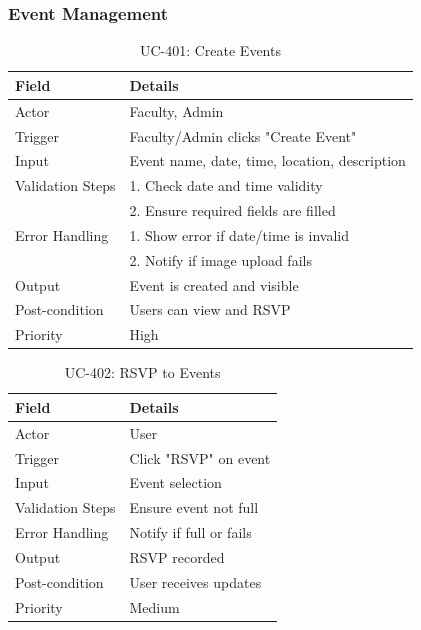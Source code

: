 \subsubsection{Event Management}
\begin{table}[H]
\centering
\caption{UC-401: Create Events}
\begin{tabular}{|l|p{10cm}|}
\hline
\textbf{Field} & \textbf{Details} \\ \hline
Actor & Faculty, Admin \\ \hline
Trigger & Faculty/Admin clicks "Create Event" \\ \hline
Input & Event name, date, time, location, description \\ \hline
Validation Steps & 1. Check date and time validity \\ 
                 & 2. Ensure required fields are filled \\ \hline
Error Handling & 1. Show error if date/time is invalid \\ 
               & 2. Notify if image upload fails \\ \hline
Output & Event is created and visible \\ \hline
Post-condition & Users can view and RSVP \\ \hline
Priority & High \\ \hline
\end{tabular}
\end{table}

\begin{table}[H]
\centering
\caption{UC-402: RSVP to Events}
\begin{tabular}{|l|p{10cm}|}
\hline
\textbf{Field} & \textbf{Details} \\ \hline
Actor & User \\ \hline
Trigger & Click "RSVP" on event \\ \hline
Input & Event selection \\ \hline
Validation Steps & Ensure event not full \\ \hline
Error Handling & Notify if full or fails \\ \hline
Output & RSVP recorded \\ \hline
Post-condition & User receives updates \\ \hline
Priority & Medium \\ \hline
\end{tabular}
\end{table}

